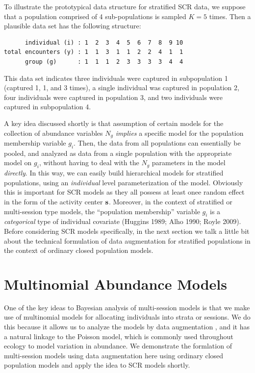 To illustrate the prototypical data structure for stratified SCR data,
we suppose that a population comprised of 4 sub-populations is sampled
$K=5$ times. Then a plausible data set has the following structure:
\begin{verbatim}
      individual (i) : 1  2  3  4  5  6  7  8  9 10  
total encounters (y) : 1  1  3  1  1  2  2  4  1  1
      group (g)      : 1  1  1  2  3  3  3  3  4  4
\end{verbatim}
This data set indicates three individuals were captured in
subpopulation 1 (captured 1, 1, and 3 times), a single individual was
captured in population 2, four individuals were captured in population
3, and two individuals were captured in subpopulation 4.

A key idea discussed shortly is that assumption of certain models for
the collection of abundance variables $N_{g}$ {\it implies} a specific
model for the population membership variable $g_{i}$.  Then, the data
from all populations can essentially be pooled, and analyzed as data
from a single population with the appropriate model on $g_{i}$,
without having to deal with  the $N_{g}$ parameters in the model {\it directly}. In this
way, we can easily build hierarchical models for stratified
populations, using an {\it individual} level parameterization of the
model. Obviously this is important for SCR models as they all possess
at least onee random effect in the form of the activity center ${\bf
  s}$. Moreover, in the context of stratified or multi-session type
models, the ``population membership'' variable $g_{i}$ is a {\it
  categorical} type of individual covariate (Huggins 1989; Alho 1990;
Royle 2009).  Before considering SCR models specifically, in the next
section we talk a
little bit about the technical formulation of data augmentation for
stratified populations in the context of ordinary closed population
models. 


\section{Multinomial Abundance Models}


One of the key ideas to Bayesian analysis of multi-session models is
that we make use of multinomial models for allocating individuals into
strata or sessions. We do this because it allows us to analyze the
models by data augmentation \citep{converse_royle:2012,
  royle_coverse:2013}, and it has a natural linkage to the Poisson
model, which is commonly used throughout ecology to model variation
in abundance. We demonstrate the formlation of multi-session models
using data augmentation here using ordinary closed population models
and apply the idea to SCR models shortly.


